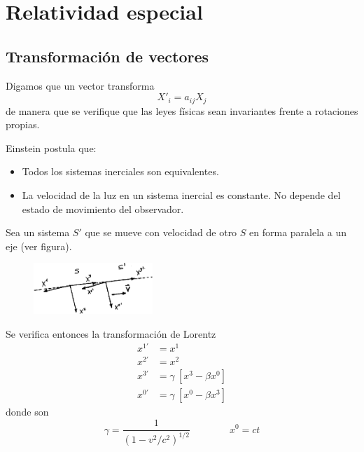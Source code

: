 \documentclass[10pt,oneside]{CBFT_book}
\begin{document}
\chapter{Relatividad especial}

\section{Transformación de vectores}

Digamos que un vector transforma 
\[
	X'_{i} = a_{ij} X_j
\]
de manera que se verifique que las leyes físicas sean invariantes frente a rotaciones propias.

Einstein postula que:
\begin{itemize}
 \item Todos los sistemas inerciales son equivalentes.
 \item La velocidad de la luz en un sistema inercial es constante. No depende del estado de
 movimiento del observador.
\end{itemize}

Sea un sistema $S'$ que se mueve con velocidad  de otro $S$ en forma paralela a un eje (ver figura).
\begin{figure}[htb]
	\begin{center}
	\includegraphics[width=0.4\textwidth]{images/fig_ft1_transfvec.pdf}	 
	\end{center}
	\caption{}
\end{figure} 

Se verifica entonces la transformación de Lorentz
\begin{align*}
	x^{1'} &= x^1  \\
	x^{2'} &= x^2  \\
	x^{3'} &= \gamma \: [ x^3 - \beta x^0]  \\
	x^{0'} &= \gamma \: [ x^0 - \beta x^3] 
\end{align*}
donde son 
\[
	\gamma = \frac{1}{(1 - v^2/c^2)^{1/2}} \qquad \qquad x^0 = ct 
\]
\end{document}
